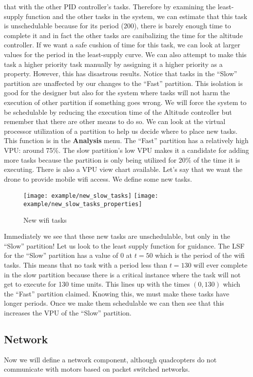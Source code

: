 that with the other PID controller's tasks. Therefore by examining the least-supply
function and the other tasks in the system, we can estimate that this task
is unschedulable because for its period (200), there is barely enough time
to complete it and in fact the other tasks are canibalizing the time
for the altitude controller. If we want a safe cushion of time for this task,
we can look at larger values for the period in the least-supply curve.
We can also attempt to make this task a higher priority task manually
by assigning it a higher priority as a property. However, this 
has disastrous results. 
Notice that tasks in the ``Slow'' partition are unaffected by our changes to the
``Fast'' partition. This isolation is good for the designer but also for
the system where tasks will not harm the execution of other partition
if something goes wrong. We will force the system to be schedulable
by reducing the execution time of the Altitude controller but remember
that there are other means to do so.
We can look at the virtual processor utilization of a partition
to help us decide where to place new tasks. This function is in the
\textbf{Analysis} menu. 
The ``Fast'' partition has a relatively high VPU: around 75\%. The slow partition's
low VPU makes it a candidate for adding more tasks because the partition is only
being utilized for 20\% of the time it is executing. There is also a VPU view
chart available. Let's say that we want the drone to provide mobile wifi access.
We define some new tasks. 
\begin{figure}[H]
\centering
\texttt{[image: example/new\_slow\_tasks]}
\texttt{[image: example/new\_slow\_tasks\_properties]}
\caption{New wifi tasks}
\end{figure}
Immediately we see that these new tasks are unschedulable, but only in the 
``Slow'' partition! 
Let us look to the least supply function for guidance. 
The LSF for the ``Slow'' partition has a value of 0 at $t = 50$ which is
the period of the wifi tasks.
This means that no task with a period less than $t = 130$ will ever complete in the slow
partition because there is a critical instance where the task will not get to execute for
130 time units. This lines up with the times $(0,130)$ which the ``Fast'' partition
claimed. Knowing this, we must make these tasks have longer periods. Once we make them
schedulable we can then see that this increases the VPU of the ``Slow'' partition.
\subsection{Network}
Now we will define a network component, although quadcopters do not communicate with motors
based on packet switched networks.
